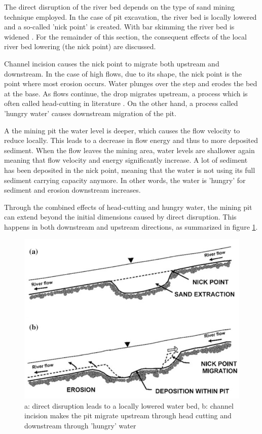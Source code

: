The direct disruption of the river bed depends on the type of sand mining technique employed. In the case of pit excavation, the river bed is locally lowered and a so-called 'nick point' is created. With bar skimming the river bed is widened \autocite{sand-mining-boek}. For the remainder of this section, the consequent effects of the local river bed lowering (the nick point) are discussed.

Channel incision causes the nick point to migrate both upstream and downstream. In the case of high flows, due to its shape, the nick point is the point where most erosion occurs. Water plunges over the step and erodes the bed at the base. As flows continue, the drop migrates upstream, a process which is often called head-cutting in literature \autocite{sand-mining-boek}. On the other hand, a process called 'hungry water' causes downstream migration of the pit.

A the mining pit the water level is deeper, which causes the flow velocity to reduce locally. This leads to a decrease in flow energy and thus to more deposited sediment. When the flow leaves the mining area, water levels are shallower again meaning that flow velocity and energy significantly increase. A lot of sediment has been deposited in the nick point, meaning that the water is not using its full sediment carrying capacity anymore. In other words, the water is 'hungry' for sediment and erosion downstream increases. 

Through the combined effects of head-cutting and hungry water, the mining pit can extend beyond the initial dimensions caused by direct disruption. This happens in both downstream and upstream directions, as summarized in figure \ref{fig:channelbedeffects}.

\begin{figure}[H]
    \centering
    \includegraphics[width=0.75\linewidth]{figures/channelbedeffects.png}
    \caption{a: direct disruption leads to a locally lowered water bed, b: channel incision makes the pit migrate upstream through head cutting and downstream through 'hungry' water}
    \label{fig:channelbedeffects}
\end{figure}

